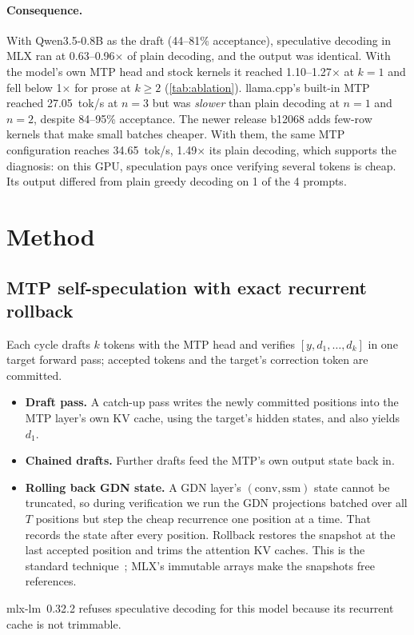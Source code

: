 \documentclass[11pt]{article}
\begin{document}
\paragraph{Consequence.} With Qwen3.5-0.8B as the draft (44--81\% acceptance), speculative decoding in MLX ran at 0.63--0.96$\times$ of plain decoding, and the output was identical. With the model's own MTP head and stock kernels it reached 1.10--1.27$\times$ at $k{=}1$ and fell below 1$\times$ for prose at $k{\ge}2$ (\cref{tab:ablation}). llama.cpp's built-in MTP reached 27.05~tok/s at $n{=}3$ but was \emph{slower} than plain decoding at $n{=}1$ and $n{=}2$, despite 84--95\% acceptance. The newer release b12068 adds few-row kernels that make small batches cheaper. With them, the same MTP configuration reaches 34.65~tok/s, 1.49$\times$ its plain decoding, which supports the diagnosis: on this GPU, speculation pays once verifying several tokens is cheap. Its output differed from plain greedy decoding on 1 of the 4 prompts.

\section{Method}
\label{sec:method}
\subsection{MTP self-speculation with exact recurrent rollback}
Each cycle drafts $k$ tokens with the MTP head and verifies $[y, d_1,\dots,d_k]$ in one target forward pass; accepted tokens and the target's correction token are committed.
\begin{itemize}
\item \textbf{Draft pass.} A catch-up pass writes the newly committed positions into the MTP layer's own KV cache, using the target's hidden states, and also yields $d_1$.
\item \textbf{Chained drafts.} Further drafts feed the MTP's own output state back in.
\item \textbf{Rolling back GDN state.} A GDN layer's $(\text{conv}, \text{ssm})$ state cannot be truncated, so during verification we run the GDN projections batched over all $T$ positions but step the cheap recurrence one position at a time. That records the state after every position. Rollback restores the snapshot at the last accepted position and trims the attention KV caches. This is the standard technique~\cite{ghantasala2026treewy,airrunner2026mlxlmmtp}; MLX's immutable arrays make the snapshots free references.
\end{itemize}
mlx-lm~0.32.2 refuses speculative decoding for this model because its recurrent cache is not trimmable.
\end{document}
